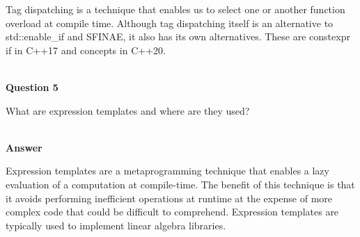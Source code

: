 Tag dispatching is a technique that enables us to select one or another function overload at compile time. Although tag dispatching itself is an alternative to std::enable\_if and SFINAE, it also has its own alternatives. These are constexpr if in C++17 and concepts in C++20.

\hspace*{\fill} \\ %
\noindent
\textbf{Question 5}

What are expression templates and where are they used?

\hspace*{\fill} \\ %
\noindent
\textbf{Answer}

Expression templates are a metaprogramming technique that enables a lazy evaluation of a computation at compile-time. The benefit of this technique is that it avoids performing inefficient operations at runtime at the expense of more complex code that could be difficult to comprehend. Expression templates are typically used to implement linear algebra libraries.












